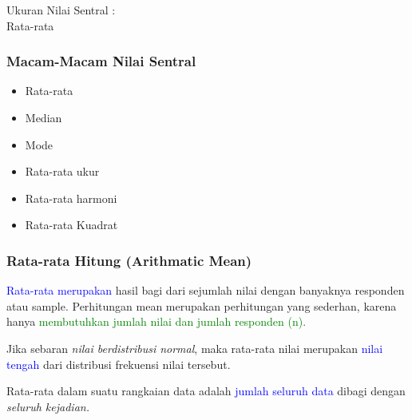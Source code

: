 \documentclass[main.tex]{subfiles}
\begin{document}
\begin{frame}[c]

	\large Ukuran Nilai Sentral :\\
	\Large Rata-rata

\end{frame}

\begin{frame}[c]
	\frametitle{Macam-Macam Nilai Sentral}
	\begin{itemize}
		\item Rata-rata
		\item Median
		\item Mode
		\item Rata-rata ukur
		\item Rata-rata harmoni
		\item Rata-rata Kuadrat
	\end{itemize}
\end{frame}

\begin{frame}[c]
	\frametitle{Rata-rata Hitung (Arithmatic Mean)}
	\textcolor{blue}{Rata-rata merupakan} hasil bagi dari sejumlah nilai dengan banyaknya responden atau sample. Perhitungan mean merupakan perhitungan yang sederhan, karena hanya \textcolor{green}{ membutuhkan jumlah nilai dan jumlah responden (n).}

	Jika sebaran \textit{nilai berdistribusi normal}, maka rata-rata nilai merupakan \textcolor{blue}{nilai tengah} dari distribusi frekuensi nilai tersebut.

	Rata-rata dalam suatu rangkaian data adalah \textcolor{blue}{jumlah seluruh data} dibagi dengan \textit{seluruh kejadian.}
\end{frame}
\end{document}
